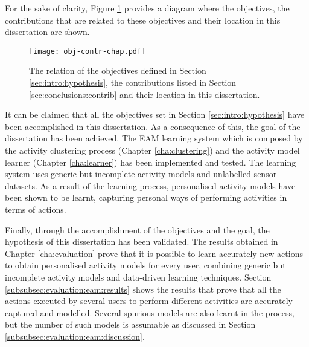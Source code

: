 For the sake of clarity, Figure \ref{fig-obj-contr-chap} provides a diagram where the objectives, the contributions that are related to these objectives and their location in this dissertation are shown.

\begin{figure}[htbp]
\centering
\texttt{[image: obj-contr-chap.pdf]}
    \caption{The relation of the objectives defined in Section \ref{sec:intro:hypothesis}, the contributions listed in Section \ref{sec:conclusions:contrib} and their location in this dissertation.}
    \label{fig-obj-contr-chap}
\end{figure}

It can be claimed that all the objectives set in Section \ref{sec:intro:hypothesis} have been accomplished in this dissertation. As a consequence of this, the goal of the dissertation has been achieved. The EAM learning system which is composed by the activity clustering process (Chapter \ref{cha:clustering}) and the activity model learner (Chapter \ref{cha:learner}) has been implemented and tested. The learning system uses generic but incomplete activity models and unlabelled sensor datasets. As a result of the learning process, personalised activity models have been shown to be learnt, capturing personal ways of performing activities in terms of actions.

Finally, through the accomplishment of the objectives and the goal, the hypothesis of this dissertation has been validated. The results obtained in Chapter \ref{cha:evaluation} prove that it is possible to learn accurately new actions to obtain personalised activity models for every user, combining generic but incomplete activity models and data-driven learning techniques. Section \ref{subsubsec:evaluation:eam:results} shows the results that prove that all the actions executed by several users to perform different activities are accurately captured and modelled. Several spurious models are also learnt in the process, but the number of such models is assumable as discussed in Section \ref{subsubsec:evaluation:eam:discussion}.